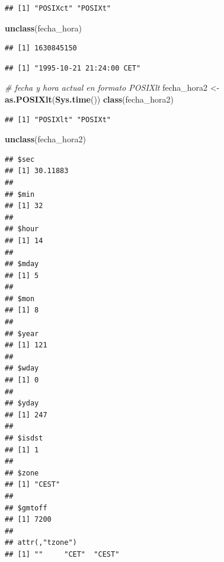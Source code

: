 \documentclass[11pt,]{book}
\newenvironment{Shaded}{\begin{snugshade}}{\end{snugshade}}
\newcommand{\CommentTok}[1]{\textcolor[rgb]{0.37,0.37,0.37}{\textit{#1}}}
\newcommand{\KeywordTok}[1]{\textcolor[rgb]{0.27,0.27,0.27}{\textbf{#1}}}
\newcommand{\NormalTok}[1]{#1}
\newcommand{\StringTok}[1]{\textcolor[rgb]{0.5,0.5,0.5}{#1}}
\begin{document}
\begin{verbatim}
## [1] "POSIXct" "POSIXt"
\end{verbatim}

\begin{Shaded}
\begin{Highlighting}[]
\KeywordTok{unclass}\NormalTok{(fecha_hora)}
\end{Highlighting}
\end{Shaded}

\begin{verbatim}
## [1] 1630845150
\end{verbatim}

\begin{Shaded}
\end{Shaded}

\begin{verbatim}
## [1] "1995-10-21 21:24:00 CET"
\end{verbatim}

\begin{Shaded}
\begin{Highlighting}[]
\CommentTok{# fecha y hora actual en formato POSIXlt}
\NormalTok{fecha_hora2 <-}\StringTok{ }\KeywordTok{as.POSIXlt}\NormalTok{(}\KeywordTok{Sys.time}\NormalTok{())}
\KeywordTok{class}\NormalTok{(fecha_hora2)}
\end{Highlighting}
\end{Shaded}

\begin{verbatim}
## [1] "POSIXlt" "POSIXt"
\end{verbatim}

\begin{Shaded}
\begin{Highlighting}[]
\KeywordTok{unclass}\NormalTok{(fecha_hora2)}
\end{Highlighting}
\end{Shaded}

\begin{verbatim}
## $sec
## [1] 30.11883
## 
## $min
## [1] 32
## 
## $hour
## [1] 14
## 
## $mday
## [1] 5
## 
## $mon
## [1] 8
## 
## $year
## [1] 121
## 
## $wday
## [1] 0
## 
## $yday
## [1] 247
## 
## $isdst
## [1] 1
## 
## $zone
## [1] "CEST"
## 
## $gmtoff
## [1] 7200
## 
## attr(,"tzone")
## [1] ""     "CET"  "CEST"
\end{verbatim}
\end{document}
